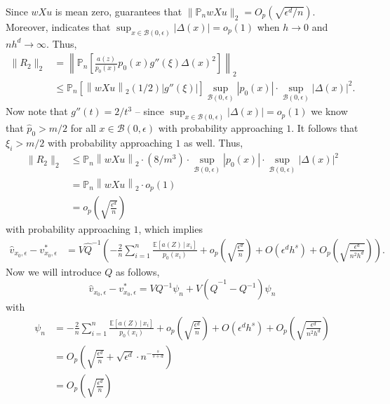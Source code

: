 \documentclass[11pt]{article}
\begin{document}
Since $wXu$ is mean zero,  guarantees that $\|\mathbb{P}_nwXu\|_2 = O_p(\sqrt{\epsilon^d/n})$. Moreover,  indicates that $\sup_{x\in \mathcal{B}(0, \epsilon)} \left|\Delta(x)\right| = o_p(1)$ when $h \rightarrow 0$ and $nh^d \rightarrow \infty$. Thus, 
\begin{align*}
    \|R_2\|_2 &= \left\|\mathbb{P}_n\left[\frac{a(z)}{p_0(x)}p_0(x)g''(\xi)\Delta(x)^2\right]\right\|_2\\
    &\leq \mathbb{P}_n[\left\|wXu\right\|_2(1/2)|g''(\xi)|]\sup_{\mathcal{B}(0, \epsilon)}|p_0(x)|\cdot \sup_{\mathcal{B}(0, \epsilon)}|\Delta(x)|^2. 
\end{align*}
Now note that $g''(t) = 2/t^3$  -- since $\sup_{x\in \mathcal{B}(0, \epsilon)} \left|\Delta(x)\right| = o_p(1)$ we know that $\hat{p}_0 > m/2$ for all $x \in \mathcal{B}(0, \epsilon)$ with probability approaching $1$. It follows that $\xi_i > m/2$ with probability approaching $1$ as well. Thus,
\begin{align*}
    \|R_2\|_2 &\leq \mathbb{P}_n\left\|wXu\right\|_2\cdot (8/m^3)\cdot \sup_{\mathcal{B}(0, \epsilon)}|p_0(x)|\cdot \sup_{\mathcal{B}(0, \epsilon)}|\Delta(x)|^2 \\
    &= \mathbb{P}_n\left\|wXu\right\|_2 \cdot o_p(1) \\
    &= o_p\left(\sqrt{\frac{\epsilon^d}{n}}\right)
\end{align*}
with probability approaching $1$, which implies
\begin{align*}
    \hat{v}_{x_0, \epsilon} - v^*_{x_0, \epsilon} &= V\hat{Q}^{-1}\left(-\frac{2}{n}\sum_{i = 1}^n\frac{\mathbb{E}[a(Z)\,|\, x_i]}{p_0(x_i)}+ o_p\left(\sqrt{\frac{\epsilon^d}{n}}\right) + O(\epsilon^dh^s) + O_p\left( \sqrt{\frac{\epsilon^d}{n^2h^d}}\right)\right).
\end{align*}
Now we will introduce $Q$ as follows,
\begin{equation*}
    \hat{v}_{x_0, \epsilon} - v^*_{x_0, \epsilon} = VQ^{-1}\psi_n + V(\hat{Q}^{-1} - Q^{-1})\psi_n
\end{equation*}
with
\begin{align*}
    \psi_n &= -\frac{2}{n}\sum_{i = 1}^n\frac{\mathbb{E}[a(Z)\,|\, x_i]}{p_0(x_i)} + o_p\left(\sqrt{\frac{\epsilon^d}{n}}\right) +   O(\epsilon^dh^s) + O_p\left( \sqrt{\frac{\epsilon^d}{n^2h^d}}\right) \\
    &= O_p\left(\sqrt{\frac{\epsilon^d}{n}} + \sqrt{\epsilon ^d} \cdot n^{-\frac{s}{s+d}}\right) \\
    &= O_p\left(\sqrt{\frac{\epsilon^d}{n}}\right)
\end{align*} 
\end{document}
